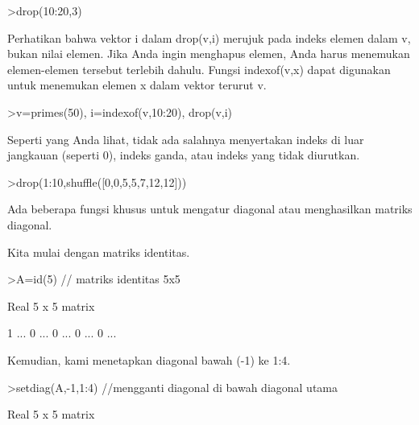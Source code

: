 \documentclass[a4paper,10pt]{article}
\begin{document}
\begin{eulernotebook}
\begin{eulercomment}
\begin{eulercomment}
\begin{eulercomment}
\begin{eulercomment}
\begin{eulercomment}
\begin{eulercomment}
\begin{eulerprompt}
>drop(10:20,3)
\end{eulerprompt}
\begin{euleroutput}
  [10,  11,  13,  14,  15,  16,  17,  18,  19,  20]
\end{euleroutput}
\begin{eulercomment}
Perhatikan bahwa vektor i dalam drop(v,i) merujuk pada indeks elemen
dalam v, bukan nilai elemen. Jika Anda ingin menghapus elemen, Anda
harus menemukan elemen-elemen tersebut terlebih dahulu. Fungsi
indexof(v,x) dapat digunakan untuk menemukan elemen x dalam vektor
terurut v.
\end{eulercomment}
\begin{eulerprompt}
>v=primes(50), i=indexof(v,10:20), drop(v,i)
\end{eulerprompt}
\begin{euleroutput}
  [2,  3,  5,  7,  11,  13,  17,  19,  23,  29,  31,  37,  41,  43,  47]
  [0,  5,  0,  6,  0,  0,  0,  7,  0,  8,  0]
  [2,  3,  5,  7,  23,  29,  31,  37,  41,  43,  47]
\end{euleroutput}
\begin{eulercomment}
Seperti yang Anda lihat, tidak ada salahnya menyertakan indeks di luar
jangkauan (seperti 0), indeks ganda, atau indeks yang tidak diurutkan.
\end{eulercomment}
\begin{eulerprompt}
>drop(1:10,shuffle([0,0,5,5,7,12,12]))
\end{eulerprompt}
\begin{euleroutput}
  [1,  2,  3,  4,  6,  8,  9,  10]
\end{euleroutput}
\begin{eulercomment}
Ada beberapa fungsi khusus untuk mengatur diagonal atau menghasilkan
matriks diagonal.

Kita mulai dengan matriks identitas.
\end{eulercomment}
\begin{eulerprompt}
>A=id(5) // matriks identitas 5x5
\end{eulerprompt}
\begin{euleroutput}
  Real 5 x 5 matrix
  
                        1     ...
                        0     ...
                        0     ...
                        0     ...
                        0     ...
\end{euleroutput}
\begin{eulercomment}
Kemudian, kami menetapkan diagonal bawah (-1) ke 1:4.
\end{eulercomment}
\begin{eulerprompt}
>setdiag(A,-1,1:4) //mengganti diagonal di bawah diagonal utama
\end{eulerprompt}
\begin{euleroutput}
  Real 5 x 5 matrix
  

\end{euleroutput}
\end{eulercomment}
\end{eulercomment}
\end{eulercomment}
\end{eulercomment}
\end{eulercomment}
\end{eulercomment}
\end{eulernotebook}
\end{document}
